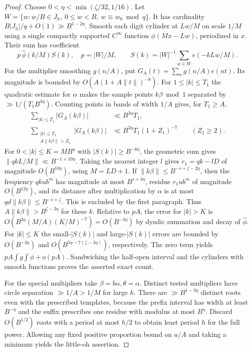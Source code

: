 \begin{proof}
Choose \(0<\eta<\min(\zeta/32,1/16)\).
Let \(W=\{w:w/B\in J_h,\ 0\le w<B,\ w\equiv w_0\bmod q\}\).
It has cardinality \(B|J_h|/q+O(1)\gg B^{1-2\eta}\).
Smooth each digit cylinder at \(Lw/M\) on scale \(1/M\)
using a single compactly supported \(C^\infty\) function
\(\phi(Mx-Lw)\), periodized in \(x\). Their sum has coefficient
\[
 p\,\widehat\phi(k/M)S(k),\quad
 p=|W|/M,\qquad
 S(k)=|W|^{-1}\sum_{w\in W}e(-kLw/M).
\]
For the multiplier smoothing \(g(n/A)\), put
\(G_A(t)=\sum_n g(n/A)e(nt)\). Its magnitude is bounded by
\(O(A(1+A\|t\|)^{-8})\).
For \(1\le |k|\le T_1\) the quadratic estimate for \(\alpha\)
makes the sample points \(k\beta\bmod1\) separated by
\(\gg 1/(T_1 B^{3\eta})\).
Counting points in bands of width \(1/A\) gives, for \(T_1\ge A\),
\[
 \begin{aligned}
 \sum_{|k|\le T_1}|G_A(k\beta)|&\ll B^{3\eta}T_1,\\
 \sum_{\substack{|k|\le T_1\\ A\|k\beta\|>Z_1}}
       |G_A(k\beta)|&\ll B^{3\eta}T_1(1+Z_1)^{-7}
                  \qquad (Z_1\ge2).
 \end{aligned}
\]
For \(0<|k|\le K=MB^\eta\) with \(|S(k)|\ge B^{-8\eta}\),
the geometric sum gives
\(\|qkL/M\|\ll B^{-1+10\eta}\).
Taking the nearest integer \(l\) gives
\(r_1=qk-lD\) of magnitude \(O(B^{10\eta})\), using \(M=LD+1\).
If \(\|k\beta\|\le B^{-s+\zeta-2\eta}\), then the frequency
\(qk u b^m\) has magnitude at most \(B^{s+4\eta}\), residue
\(r_1 u b^m\) of magnitude \(O(B^{12\eta})\),
and its distance after multiplication by \(\alpha\) is
at most \(qd\|k\beta\|\le B^{-s+\zeta}\).
This is excluded by the first paragraph. Thus
\(A\|k\beta\|>B^{\zeta-3\eta}\) for these \(k\).
Relative to \(pA\), the error for \(|k|>K\) is
\(O(B^{3\eta}(M/A)(K/M)^{-7})=O(B^{-3\eta})\) by dyadic
summation and decay of \(\widehat\phi\).
For \(|k|\le K\) the small-\(|S(k)|\) and large-\(|S(k)|\)
errors are bounded by \(O(B^{-3\eta})\) and
\(O(B^{5\eta-7(\zeta-3\eta)})\), respectively.
The zero term yields \(pA\int g\int\phi+o(pA)\).
Sandwiching the half-open interval and the cylinders with
smooth functions proves the asserted exact count.

For the special multipliers take \(\beta=b\alpha,\theta=\alpha\).
Distinct tested multipliers have circle separation \(\gg 1/A>1/M\)
for large \(h\). There are \(\gg B^{1-3\eta}\) distinct roots
even with the prescribed templates, because the prefix interval
has width at least \(B^{-\eta}\) and the suffix prescribes one
residue with modulus at most \(B^\eta\).
Discard \(O(B^{1/2})\) roots with a period at most \(h/2\) to
obtain least period \(h\) for the full power. Allowing any fixed
positive proportion bound on \(a/A\) and taking a minimum yields
the little-oh assertion.
\end{proof}

